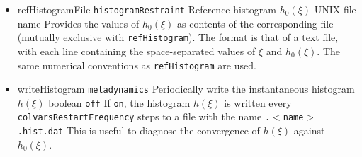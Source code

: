 \begin{itemize}
\item %
  \key
  {refHistogramFile}{%
    \texttt{histogramRestraint}}{%
    Reference histogram $h_{0}(\xi)$}{%
    UNIX file name}{%
    Provides the values of $h_{0}(\xi)$ as contents of the corresponding file (mutually exclusive with \texttt{refHistogram}).
    The format is that of a text file, with each line containing the space-separated values of $\xi$ and $h_{0}(\xi)$.
    The same numerical conventions as \texttt{refHistogram} are used.
  }

\item %
  \keydef
    {writeHistogram}{%
    \texttt{metadynamics}}{%
    Periodically write the instantaneous histogram $h(\xi)$}{%
    boolean}{%
    \texttt{off}}{%
    If \texttt{on}, the histogram $h(\xi)$ is written every \texttt{colvarsRestartFrequency} steps to a file with the name \outputName\texttt{.$<$name$>$.hist.dat}}{%
    This is useful to diagnose the convergence of $h(\xi)$ against $h_{0}(\xi)$.
  }

\end{itemize}


